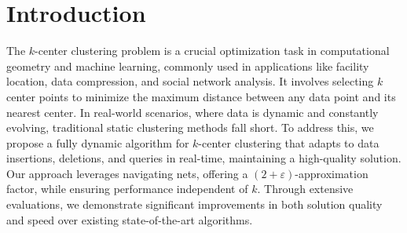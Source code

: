 \section{Introduction}

The $k$-center clustering problem is a crucial optimization task in computational geometry and machine learning, commonly used in applications like facility location, data compression, and social network analysis. It involves selecting $k$ center points to minimize the maximum distance between any data point and its nearest center. In real-world scenarios, where data is dynamic and constantly evolving, traditional static clustering methods fall short. To address this, we propose a fully dynamic algorithm for $k$-center clustering that adapts to data insertions, deletions, and queries in real-time, maintaining a high-quality solution. Our approach leverages navigating nets, offering a $(2 + \varepsilon)$-approximation factor, while ensuring performance independent of $k$. Through extensive evaluations, we demonstrate significant improvements in both solution quality and speed over existing state-of-the-art algorithms.
